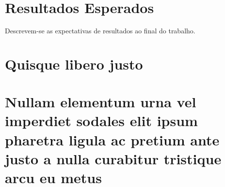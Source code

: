 \documentclass[12pt, oneside, a4paper, chapter=TITLE,section=TITLE]{abntex2}
\begin{document}
\chapter{Resultados Esperados}
Descrevem-se as expectativas de resultados ao final do trabalho.


\postextual



%
%


\begin{apendicesenv} %

\partapendices %

\chapter{Quisque libero justo}

\lipsum[50]

\chapter{Nullam elementum urna vel imperdiet sodales elit ipsum pharetra ligula ac pretium ante justo a nulla curabitur tristique arcu eu metus}
\lipsum[55-57]

\end{apendicesenv} %
\end{document}
